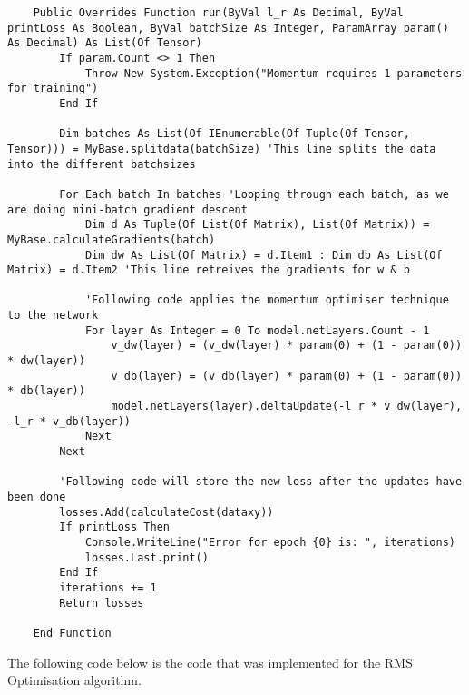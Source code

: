 \begin{verbatim}
    Public Overrides Function run(ByVal l_r As Decimal, ByVal printLoss As Boolean, ByVal batchSize As Integer, ParamArray param() As Decimal) As List(Of Tensor)
        If param.Count <> 1 Then
            Throw New System.Exception("Momentum requires 1 parameters for training")
        End If

        Dim batches As List(Of IEnumerable(Of Tuple(Of Tensor, Tensor))) = MyBase.splitdata(batchSize) 'This line splits the data into the different batchsizes

        For Each batch In batches 'Looping through each batch, as we are doing mini-batch gradient descent
            Dim d As Tuple(Of List(Of Matrix), List(Of Matrix)) = MyBase.calculateGradients(batch)
            Dim dw As List(Of Matrix) = d.Item1 : Dim db As List(Of Matrix) = d.Item2 'This line retreives the gradients for w & b

            'Following code applies the momentum optimiser technique to the network
            For layer As Integer = 0 To model.netLayers.Count - 1
                v_dw(layer) = (v_dw(layer) * param(0) + (1 - param(0)) * dw(layer))
                v_db(layer) = (v_db(layer) * param(0) + (1 - param(0)) * db(layer))
                model.netLayers(layer).deltaUpdate(-l_r * v_dw(layer), -l_r * v_db(layer))
            Next
        Next

        'Following code will store the new loss after the updates have been done
        losses.Add(calculateCost(dataxy))
        If printLoss Then
            Console.WriteLine("Error for epoch {0} is: ", iterations)
            losses.Last.print()
        End If
        iterations += 1
        Return losses

    End Function

\end{verbatim}

The following code below is the code that was implemented for the RMS Optimisation algorithm.

